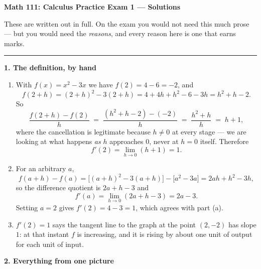 \documentclass[11pt]{article}
\newcommand{\prob}[1]{\bigskip\noindent\textbf{\large #1}\par\smallskip}
\begin{document}
\begin{center}
{\Large\bfseries Math 111: Calculus \quad Practice Exam 1 --- Solutions}
\end{center}

\medskip
\noindent These are written out in full. On the exam you would not need this much prose ---
but you would need the \emph{reasons}, and every reason here is one that earns marks.

\bigskip\hrule

\prob{1. The definition, by hand}

\begin{enumerate}
\item With $f(x)=x^2-3x$ we have $f(2) = 4-6 = -2$, and
\[
f(2+h) = (2+h)^2 - 3(2+h) = 4 + 4h + h^2 - 6 - 3h = h^2 + h - 2 .
\]
So
\[
\frac{f(2+h)-f(2)}{h} \;=\; \frac{(h^2+h-2) - (-2)}{h} \;=\; \frac{h^2+h}{h} \;=\; h+1 ,
\]
where the cancellation is legitimate because $h \neq 0$ at every stage --- we are looking at
what happens \emph{as} $h$ approaches $0$, never at $h=0$ itself. Therefore
\[
f'(2) = \lim_{h\to 0}(h+1) = \boxed{1}.
\]

\item For an arbitrary $a$,
\[
f(a+h)-f(a) = \big[(a+h)^2 - 3(a+h)\big] - \big[a^2-3a\big] = 2ah + h^2 - 3h ,
\]
so the difference quotient is $2a + h - 3$ and
\[
f'(a) = \lim_{h\to 0}(2a+h-3) = 2a-3 .
\]
Setting $a=2$ gives $f'(2) = 4-3 = 1$, which agrees with part (a).

\item $f'(2)=1$ says the tangent line to the graph at the point $(2,-2)$ has slope $1$: at
that instant $f$ is increasing, and it is rising by about one unit of output for each unit
of input.
\end{enumerate}

\newpage
\prob{2. Everything from one picture}
\end{document}

